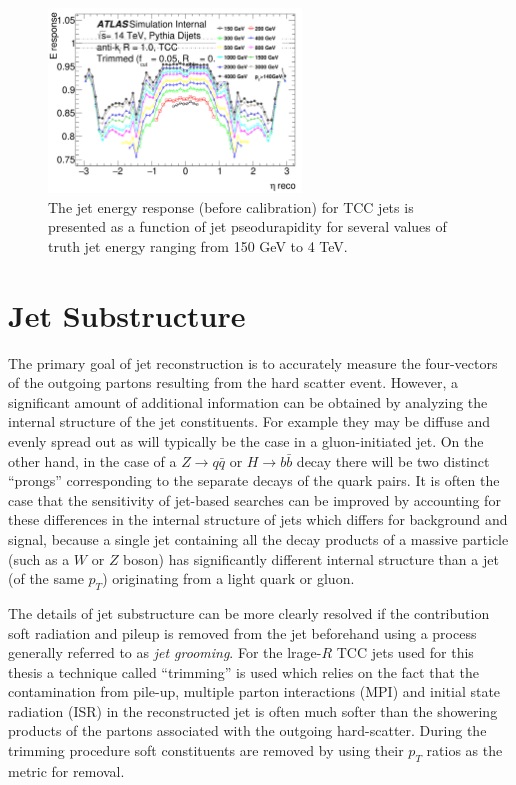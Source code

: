 \begin{figure}
	\centering
	\includegraphics[width=0.6\textwidth]{tcc_jet_e_response}
	\caption{
	The jet energy response (before calibration) for TCC jets is presented as a function of jet pseodurapidity for several values of truth jet energy ranging from 150 GeV to 4 TeV.
	}
	\label{fig:tcc_jet_e_response}
\end{figure}

\section{Jet Substructure}
\label{sec:jet_substructure}
The primary goal of jet reconstruction is to accurately measure the four-vectors of the outgoing partons resulting from the hard scatter event.
However, a significant amount of additional information can be obtained by analyzing the internal structure of the jet constituents.
For example they may be diffuse and evenly spread out as will typically be the case in a gluon-initiated jet.
On the other hand, in the case of a $Z \rightarrow q\bar{q}$ or $H \rightarrow b\bar{b}$ decay there will be two distinct ``prongs'' corresponding to the separate decays of the quark pairs.
It is often the case that the sensitivity of jet-based searches can be improved by accounting for these differences in the internal structure of jets which differs for background and signal, because a single jet containing all the decay products of a massive particle (such as a $W$ or $Z$ boson) has significantly different internal structure than a jet (of the same $p_T$) originating from a light quark or gluon.

The details of jet substructure can be more clearly resolved if the contribution soft radiation and pileup is removed from the jet beforehand using a process generally referred to as \textit{jet grooming}.
For the lrage-$R$ TCC jets used for this thesis a technique called ``trimming'' is used which relies on the fact that the contamination from pile-up, multiple parton interactions (MPI) and initial state radiation (ISR) in the reconstructed jet is often much softer than the showering products of the partons associated with the outgoing hard-scatter.
During the trimming procedure soft constituents are removed by using their $p_T$ ratios as the metric for removal.

